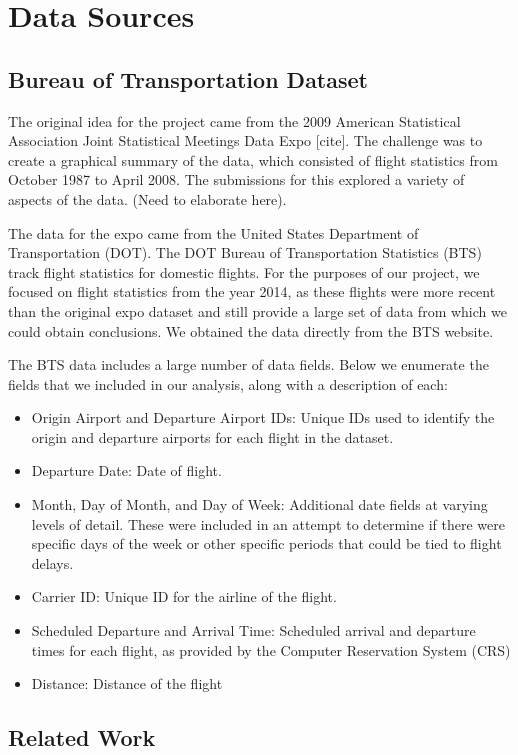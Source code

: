 \documentclass{article}
\begin{document}
\section{Data Sources}
\subsection{Bureau of Transportation Dataset}

The original idea for the project came from the 2009 American Statistical Association Joint Statistical Meetings Data Expo [cite]. The challenge was to create a graphical summary of the data, which consisted of flight statistics from October 1987 to April 2008. The submissions for this explored a variety of aspects of the data. (Need to elaborate here).

The data for the expo came from the United States Department of Transportation (DOT). The DOT Bureau of Transportation Statistics (BTS) track flight statistics for domestic flights. For the purposes of our project, we focused on flight statistics from the year 2014, as these flights were more recent than the original expo dataset and still provide a large set of data from which we could obtain conclusions. We obtained the data directly from the BTS website.  

The BTS data includes a large number of data fields. Below we enumerate the fields that we included in our analysis, along with a description of each:

\begin{itemize}
\item Origin Airport and Departure Airport IDs: Unique IDs used to identify the origin and departure airports for each flight in the dataset. 
\item Departure Date: Date of flight. 
\item Month, Day of Month, and Day of Week: Additional date fields at varying levels of detail. These were included in an attempt to determine if there were specific days of the week or other specific periods that could be tied to flight delays. 
\item Carrier ID: Unique ID for the airline of the flight.
\item Scheduled Departure and Arrival Time: Scheduled arrival and departure times for each flight, as provided by the Computer Reservation System (CRS)
\item Distance: Distance of the flight
\end{itemize}

\subsection{Related Work}
\end{document}
